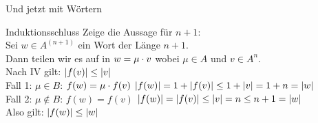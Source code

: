 \begin{frame}{Und jetzt mit Wörtern}

	\begin{block}{Induktionsschluss}
		Zeige die Aussage für $n+1$:\\
		Sei $w \in A^{(n+1)}$ ein Wort der Länge $n+1$.\\
		Dann teilen wir es auf in $w = \mu \cdot v$ wobei $\mu \in A$ und $v \in A^n$.\\
		Nach IV gilt: $\left\lvert f(v) \right\rvert \le \left\lvert v \right\rvert$\\
		Fall 1: $\mu \in B$: $f(w) = \mu \cdot f(v)$ \impl $\left\lvert f(w) \right\rvert = 1 + \left\lvert f(v) \right\rvert \le 1 + \left\lvert v \right\rvert = 1+n = \left\lvert w \right\rvert$\\
		Fall 2: $\mu \notin B$: $f(w) = f(v)$ \impl $\left\lvert f(w) \right\rvert = \left\lvert f(v) \right\rvert \le \left\lvert v \right\rvert = n \le n+1 = \left\lvert w \right\rvert$\\
		\smallskip
		Also gilt: $\left\lvert f(w) \right\rvert \le \left\lvert w \right\rvert$
	\end{block}
\end{frame}